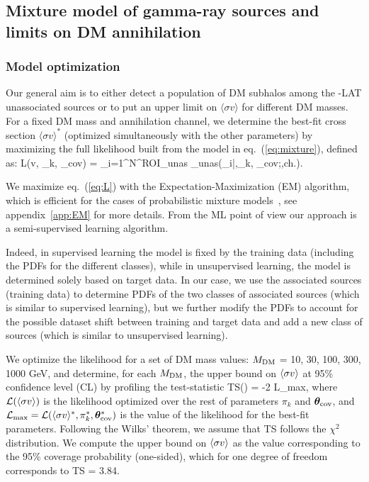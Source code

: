 \subsection{Mixture model of gamma-ray sources and limits on DM annihilation}
\label{sec:halos:results}

\subsubsection{Model optimization}
\label{sec:model-opt}

Our general aim is to either detect a population of DM subhalos among the \Fermi-LAT unassociated sources or to put an upper limit on $\langle\sigma v\rangle$ for different DM masses. For a fixed DM mass and annihilation channel, we determine the best-fit cross section $\langle\sigma v\rangle^*$ (optimized simultaneously with the other parameters) by maximizing the full likelihood built from the model in eq.~(\ref{eq:mixture}), defined as:
\be
\label{eq:L}
{\cal L}(\langle\sigma v\rangle, \pi_k, \btheta_{\rm cov}) = \prod_{i=1}^{N^{\rm ROI}_{\rm unas}} _{\rm unas}(\bx_i|\sigmav,\pi_k, \btheta_{\rm cov};\mdm,{\rm ch.}).
\ee

We maximize eq.~(\ref{eq:L}) with the Expectation-Maximization (EM) algorithm, which is efficient for the cases of probabilistic mixture models~\cite{10.1162/089976602753284446_Saerens}, see appendix~\ref{app:EM} for more details.
From the ML point of view our approach is a semi-supervised learning algorithm.

Indeed, in supervised learning the model is fixed by the training data (including the PDFs for the different classes), while in unsupervised learning, the model is determined solely based on target data.
In our case, we use the associated sources (training data) to determine PDFs of the two classes of associated sources (which is similar to supervised learning), but we further modify the PDFs to account for the possible dataset shift between training and target data and add a new class of sources (which is similar to unsupervised learning).


We optimize the likelihood for a set of DM mass values: ${M_\textrm{DM}}$ = 10, 30, 100, 300, 1000 GeV, and determine, for each ${M_\textrm{DM}}$, the upper bound on $\langle \sigma v \rangle$ at 95\% confidence level (CL) by profiling the test-statistic 
\be
{\rm TS}(\sigmav) = -2\ln {}
{{\cal L}_{\rm max}}, 
\label{eq:TS}
\ee
where ${\cal L}(\langle \sigma v \rangle)$ is the likelihood optimized over the rest of parameters $\pi_k$ and $\boldsymbol{\theta}_{\rm cov}$, and ${\cal L}_{\rm max}={\cal L}(\langle \sigma v \rangle^*,\pi_k^*,\boldsymbol{\theta}_{\rm cov}^*)$ is the value of the likelihood for the best-fit parameters. 
Following the Wilks' theorem, we assume that TS follows the $\chi^2$ distribution. 
We compute the upper bound on $\langle \sigma v \rangle$ as the value corresponding to the 95\% coverage probability (one-sided), which for one degree of freedom corresponds to
TS = 3.84.

